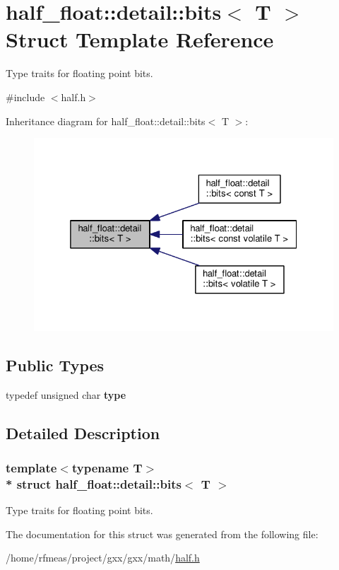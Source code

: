 \hypertarget{structhalf__float_1_1detail_1_1bits}{}\section{half\+\_\+float\+:\+:detail\+:\+:bits$<$ T $>$ Struct Template Reference}
\label{structhalf__float_1_1detail_1_1bits}


Type traits for floating point bits.  




{\ttfamily \#include $<$half.\+h$>$}



Inheritance diagram for half\+\_\+float\+:\+:detail\+:\+:bits$<$ T $>$\+:
\nopagebreak
\begin{figure}[H]
\begin{center}
\leavevmode
\includegraphics[width=325pt]{structhalf__float_1_1detail_1_1bits__inherit__graph}
\end{center}
\end{figure}
\subsection*{Public Types}
\begin{DoxyCompactItemize}
\item 
typedef unsigned char {\bfseries type}\hypertarget{structhalf__float_1_1detail_1_1bits_a6087f39bed27f25b3be91078a4a6dbdc}{}\label{structhalf__float_1_1detail_1_1bits_a6087f39bed27f25b3be91078a4a6dbdc}

\end{DoxyCompactItemize}


\subsection{Detailed Description}
\subsubsection*{template$<$typename T$>$\\*
struct half\+\_\+float\+::detail\+::bits$<$ T $>$}

Type traits for floating point bits. 

The documentation for this struct was generated from the following file\+:\begin{DoxyCompactItemize}
\item 
/home/rfmeas/project/gxx/gxx/math/\hyperlink{half_8h}{half.\+h}\end{DoxyCompactItemize}
